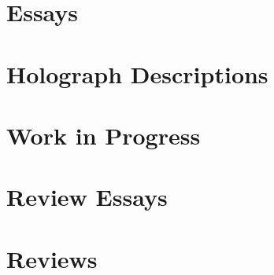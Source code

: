 \documentclass[
]{scrbook}
\begin{document}
\sloppy                         %




\tableofcontents  
\thispagestyle{empty}



\cleardoublepage

\part{Essays}







\part{Holograph Descriptions}



\part{Work in Progress}



\part{Review Essays}


\part{Reviews}





\appendix


\end{document}
